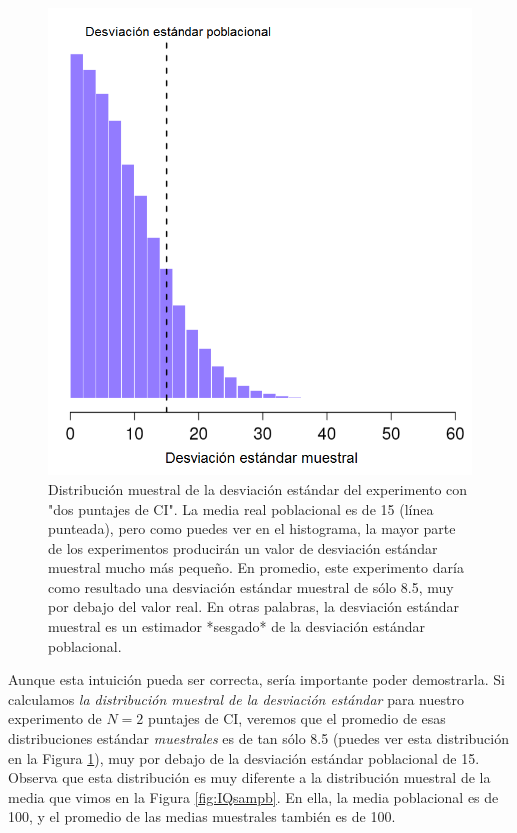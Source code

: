 \documentclass[spanish,]{book}
\begin{document}
\begin{figure}
\includegraphics[width=9.65in]{img/estimation/samplingDistSampleSD} \caption{Distribución muestral de la desviación estándar del experimento con "dos puntajes de CI". La media real poblacional es de 15 (línea punteada), pero como puedes ver en el histograma, la mayor parte de los experimentos producirán un valor de desviación estándar muestral mucho más pequeño. En promedio, este experimento daría como resultado una desviación estándar muestral de sólo 8.5, muy por debajo del valor real. En otras palabras, la desviación estándar muestral es un estimador *sesgado* de la desviación estándar poblacional.}\label{fig:sampdistsd}
\end{figure}

Aunque esta intuición pueda ser correcta, sería importante poder
demostrarla. Si calculamos \emph{la distribución muestral de la
desviación estándar} para nuestro experimento de \(N=2\) puntajes de CI,
veremos que el promedio de esas distribuciones estándar
\emph{muestrales} es de tan sólo 8.5 (puedes ver esta distribución en la
Figura \ref{fig:sampdistsd}), muy por debajo de la desviación estándar
poblacional de 15. Observa que esta distribución es muy diferente a la
distribución muestral de la media que vimos en la Figura
\ref{fig:IQsampb}. En ella, la media poblacional es de 100, y el
promedio de las medias muestrales también es de 100.
\end{document}
